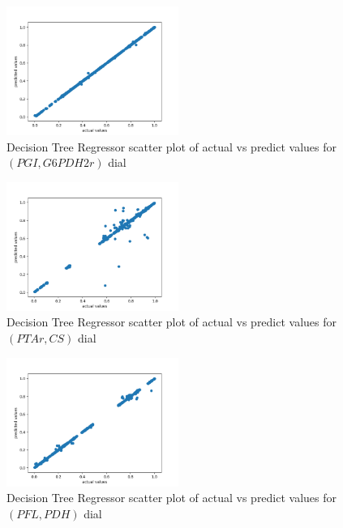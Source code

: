 \documentclass[12pt,chapterheads]{ucsd}
\begin{document}
\begin{figure}[h] 
\centering
\includegraphics[width=0.5\textwidth]{Figures/PGI_G6PDH2r_dtr}
\caption[Decision Tree Regressor scatter plot of actual vs predict values for $(PGI, G6PDH2r)$ dial]
{Decision Tree Regressor scatter plot of actual vs predict values for $(PGI, G6PDH2r)$ dial}
\label{fig:PgiG6pdh2rDtr}
\end{figure}

\begin{figure}[h] 
\centering
\includegraphics[width=0.5\textwidth]{Figures/PTAr_CS_dtr}
\caption[Decision Tree Regressor scatter plot of actual vs predict values for $(PTAr, CS)$ dial]
{Decision Tree Regressor scatter plot of actual vs predict values for $(PTAr, CS)$ dial}
\label{fig:PtarCsDtr}
\end{figure}

\begin{figure}[h] 
\centering
\includegraphics[width=0.5\textwidth]{Figures/PFL_PDH_dtr}
\caption[Decision Tree Regressor scatter plot of actual vs predict values for $(PFL, PDH)$ dial]
{Decision Tree Regressor scatter plot of actual vs predict values for $(PFL, PDH)$ dial}
\label{fig:PflPdhDtr}
\end{figure}
\end{document}

